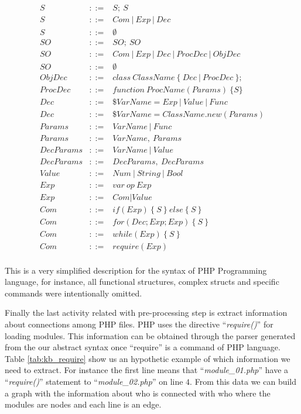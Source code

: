 \begin{eqnarray*}
S & ::= & S;\:S \\
S & ::= & Com\:|\:Exp\:|\:Dec \\
S & ::= & \emptyset \\
SO & ::= & SO;\:SO \\
SO & ::= & Com\:|\:Exp\:|\:Dec\:|\:ProcDec\:|\:ObjDec \\
SO & ::= & \emptyset \\
ObjDec & ::= & class\:ClassName\:\{\:Dec\:|\:ProcDec\:\}; \\
ProcDec & ::= & function\:ProcName(Params)\:\{S\} \\
Dec & ::= & \$VarName = Exp\:|\:Value\:|\:Func \\
Dec & ::= & \$VarName = ClassName.new(Params) \\
Params & ::= & VarName\:|\:Func \\
Params & ::= & VarName,\:Params \\
DecParams & ::= & VarName\:|\:Value \\
DecParams & ::= & DecParams,\:DecParams \\
Value & ::= & Num\:|\:String\:|\:Bool \\
Exp & ::= & var\:op\:Exp \\
Exp & ::= & Com|Value \\
Com & ::= & if(Exp)\:\{\:S\:\}\:else\:\{\:S\:\} \\
Com & ::= & for(Dec;Exp;Exp)\:\{\:S\:\} \\
Com & ::= & while(Exp)\:\{\:S\:\} \\
Com & ::= & require(Exp) \\
\end{eqnarray*}

This is a very simplified description for the syntax of PHP Programming language, for instance, all functional structures, complex structs and specific commands were intentionally omitted. 

Finally the last activity related with pre-processing step is extract information about connections among PHP files. PHP uses the directive ``\textit{require()}'' for loading modules. This information can be obtained through the parser generated from the our abstract syntax once ``require'' is a command of PHP language. Table \ref{tab:kb_require} show us an hypothetic  example of which information we need to extract. For instance the first line means that ``\textit{module\_01.php}'' have a ``\textit{require()}'' statement to ``\textit{module\_02.php}'' on line $4$. From this data we can build a  graph with the information about who is connected with who where the modules are nodes and each line is an edge.

